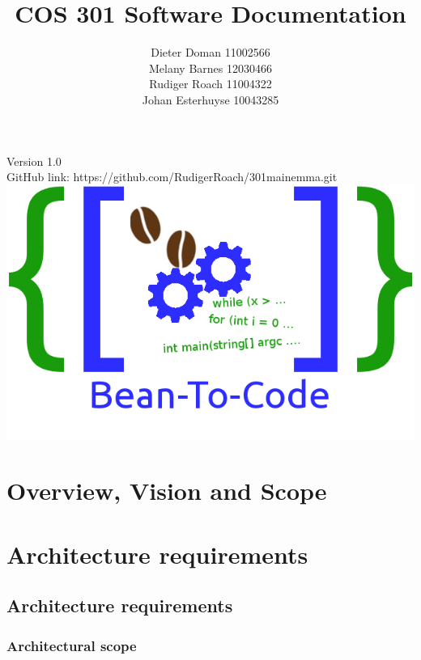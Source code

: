 \documentclass[10pt,a4paper]{article}
\title{COS 301 Software Documentation}
\author{Dieter Doman 11002566 \\
		Melany Barnes 12030466 \\
		Rudiger Roach 11004322 \\
		Johan Esterhuyse 10043285}
\date{}
\begin{document}
\maketitle
\begin{center}
Version 1.0 \\
GitHub link: https://github.com/RudigerRoach/301\textunderscore main\textunderscore emma.git \\
\vspace*{5\baselineskip}
\includegraphics[scale=0.35]{Pictures/Logo.png}
\end{center}
\pagebreak
\tableofcontents
\pagebreak
\section{Overview, Vision and Scope}
\section{Architecture requirements}
\subsection{Architecture requirements}
\subsubsection{Architectural scope}
\end{document}
